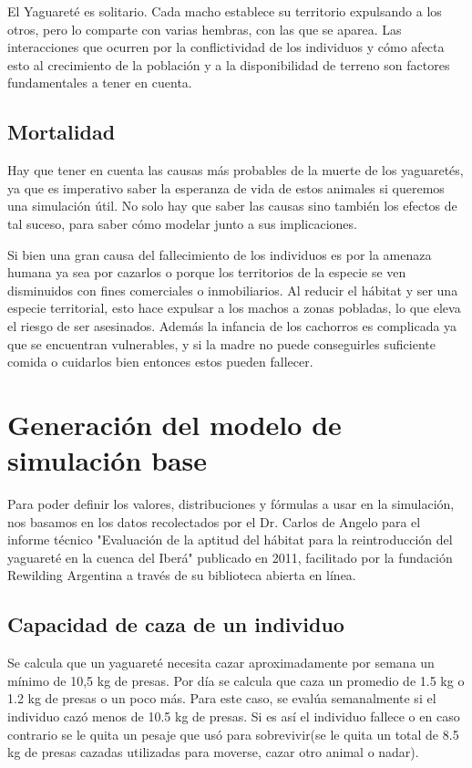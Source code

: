     El Yaguareté es solitario. Cada macho establece su territorio expulsando a los otros, pero lo comparte con varias hembras, con las que se aparea. Las interacciones que ocurren por la conflictividad de los individuos y cómo afecta esto al crecimiento de la población y a la disponibilidad de terreno son factores fundamentales a tener en cuenta.
    
    \subsection{Mortalidad}
    Hay que tener en cuenta las causas más probables de la muerte de los yaguaretés, ya que es imperativo saber la esperanza de vida de estos animales si queremos una simulación útil. No solo hay que saber las causas sino también los efectos de tal suceso, para saber cómo modelar junto a sus implicaciones.
    
    Si bien una gran causa del fallecimiento de los individuos es por la amenaza humana ya sea por cazarlos o porque los territorios de la especie se ven disminuidos con fines comerciales o inmobiliarios. Al reducir el hábitat y ser una especie territorial, esto hace expulsar a los machos a zonas pobladas, lo que eleva el riesgo de ser asesinados.
    Además la infancia de los cachorros es complicada ya que se encuentran vulnerables, y si la madre no puede conseguirles suficiente comida o cuidarlos bien entonces estos pueden fallecer.

\section{Generación del modelo de simulación base}

    Para poder definir los valores, distribuciones y fórmulas a usar en la simulación, nos basamos en los datos
    recolectados por el Dr. Carlos de Angelo para el informe técnico "Evaluación de la aptitud del hábitat para la
    reintroducción del yaguareté en la cuenca del Iberá" publicado en 2011, facilitado por la fundación Rewilding
    Argentina a través de su biblioteca abierta en línea.

    \subsection{Capacidad de caza de un individuo}
    Se calcula que un yaguareté necesita cazar aproximadamente por semana un mínimo de 10,5 kg de presas. Por día se calcula que caza un promedio de 1.5 kg o 1.2 kg de presas o un poco más. Para este caso, se evalúa semanalmente si el individuo cazó menos de 10.5 kg de presas. Si es así el individuo fallece o en caso contrario se le quita un pesaje que usó para sobrevivir(se le quita un total de 8.5 kg de presas cazadas utilizadas para moverse, cazar otro animal o nadar).
    
